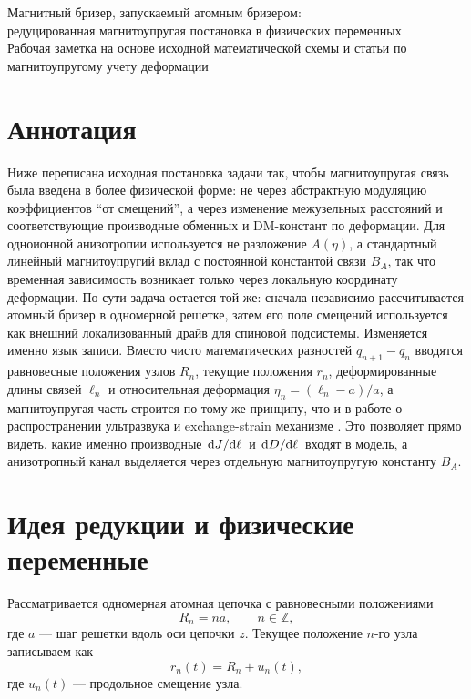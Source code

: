 \documentclass[12pt,a4paper]{article}
\begin{document}
\begin{center}
{\LARGE Магнитный бризер, запускаемый атомным бризером:\\[0.2em]
редуцированная магнитоупругая постановка в физических переменных}\\[0.8em]
{\large Рабочая заметка на основе исходной математической схемы и статьи по магнитоупругому учету деформации}\\[0.6em]
\end{center}

\section*{Аннотация}
Ниже переписана исходная постановка задачи так, чтобы магнитоупругая связь была введена в более физической форме: не через абстрактную модуляцию коэффициентов ``от смещений'', а через изменение межузельных расстояний и соответствующие производные обменных и DM-констант по деформации. Для одноионной анизотропии используется не разложение $A(\eta)$, а стандартный линейный магнитоупругий вклад с постоянной константой связи $B_A$, так что временная зависимость возникает только через локальную координату деформации. По сути задача остается той же: сначала независимо рассчитывается атомный бризер в одномерной решетке, затем его поле смещений используется как внешний локализованный драйв для спиновой подсистемы. Изменяется именно язык записи. Вместо чисто математических разностей $q_{n+1}-q_n$ вводятся равновесные положения узлов $R_n$, текущие положения $r_n$, деформированные длины связей $\ell_n$ и относительная деформация $\eta_n=(\ell_n-a)/a$, а магнитоупругая часть строится по тому же принципу, что и в работе о распространении ультразвука и exchange-strain механизме \cite{Tereshchenko2022}. Это позволяет прямо видеть, какие именно производные $\dv*{J}{\ell}$ и $\dv*{D}{\ell}$ входят в модель, а анизотропный канал выделяется через отдельную магнитоупругую константу $B_A$.

\section{Идея редукции и физические переменные}
Рассматривается одномерная атомная цепочка с равновесными положениями
\begin{equation}
R_n = na, \qquad n\in\mathbb{Z},
\end{equation}
где $a$ --- шаг решетки вдоль оси цепочки $z$. Текущее положение $n$-го узла записываем как
\begin{equation}
r_n(t)=R_n+u_n(t),
\end{equation}
где $u_n(t)$ --- продольное смещение узла.
\end{document}
